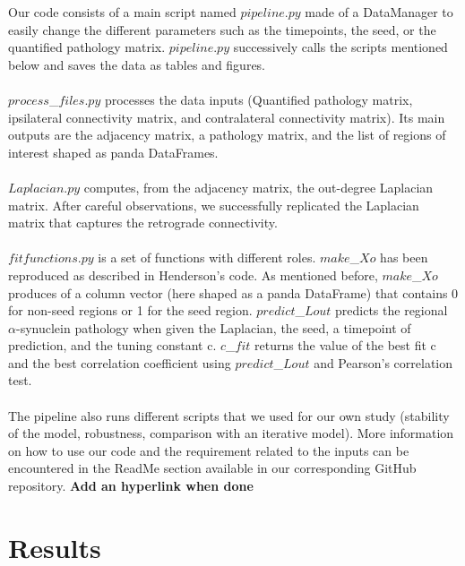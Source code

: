 Our code consists of a main script named $pipeline.py$ made of a DataManager to easily change the different parameters such as the timepoints, the seed, or the quantified pathology matrix. $pipeline.py$ successively calls the scripts mentioned below and saves the data as tables and figures.\\
\\
$process$\_$files.py$ processes the data inputs (Quantified pathology matrix, ipsilateral connectivity matrix, and contralateral connectivity matrix). Its main outputs are the adjacency matrix, a pathology matrix, and the list of regions of interest shaped as panda DataFrames.\\
\\
$Laplacian.py$ computes, from the adjacency matrix, the out-degree Laplacian matrix. After careful observations, we successfully replicated the Laplacian matrix that captures the retrograde connectivity.\\
\\
$fitfunctions.py$ is a set of functions with different roles. $make$\_$Xo$ has been reproduced as described in Henderson's code. As mentioned before, $make$\_$Xo$ produces of a column vector (here shaped as a panda DataFrame) that contains 0 for non-seed regions or 1 for the seed region. $predict$\_$Lout$ predicts the regional $\alpha$-synuclein pathology when given the Laplacian, the seed, a timepoint of prediction, and the tuning constant c. $c$\_$fit$ returns the value of the best fit c and the best correlation coefficient using $predict$\_$Lout$ and Pearson's correlation test.\\
\\
The pipeline also runs different scripts that we used for our own study (stability of the model, robustness, comparison with an iterative model). More information on how to use our code and the requirement related to the inputs can be encountered in the ReadMe section available in our corresponding GitHub repository. \textbf{Add an hyperlink when done}\\

\section{Results}
